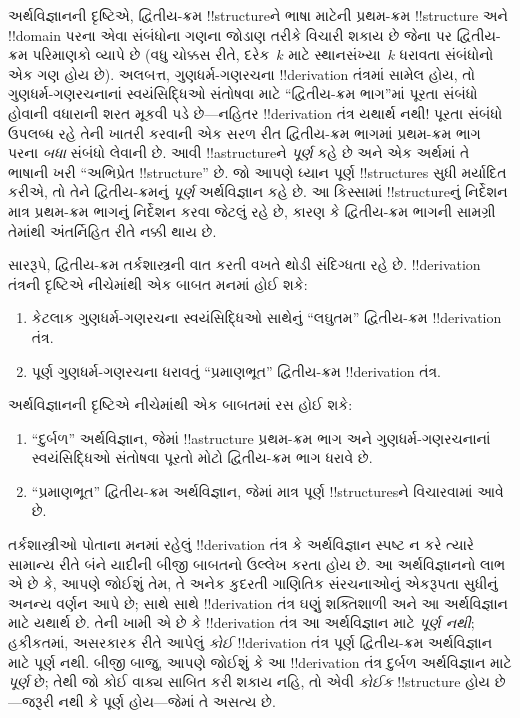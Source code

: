 \documentclass[../../../include/open-logic-section]{subfiles}
\begin{document}
અર્થવિજ્ઞાનની દૃષ્ટિએ, દ્વિતીય-ક્રમ !!{structure}ને ભાષા માટેની
પ્રથમ-ક્રમ !!{structure} અને !!{domain} પરના એવા સંબંધોના ગણના જોડાણ
તરીકે વિચારી શકાય છે જેના પર દ્વિતીય-ક્રમ પરિમાણકો વ્યાપે છે (વધુ
ચોક્કસ રીતે, દરેક~$k$ માટે સ્થાનસંખ્યા~$k$ ધરાવતા સંબંધોનો એક ગણ હોય
છે). અલબત્ત, ગુણધર્મ-ગણરચના !!{derivation} તંત્રમાં સામેલ હોય, તો
ગુણધર્મ-ગણરચનાનાં સ્વયંસિદ્ધિઓ સંતોષવા માટે ``દ્વિતીય-ક્રમ ભાગ''માં
પૂરતા સંબંધો હોવાની વધારાની શરત મૂકવી પડે છે---નહિતર !!{derivation}
તંત્ર યથાર્થ નથી!{} પૂરતા સંબંધો ઉપલબ્ધ રહે તેની ખાતરી કરવાની એક સરળ
રીત દ્વિતીય-ક્રમ ભાગમાં પ્રથમ-ક્રમ ભાગ પરના \emph{બધા} સંબંધો લેવાની
છે. આવી !!a{structure}ને \emph{પૂર્ણ} કહે છે અને એક અર્થમાં તે ભાષાની
ખરી ``અભિપ્રેત !!{structure}'' છે. જો આપણે ધ્યાન પૂર્ણ !!{structure}s
સુધી મર્યાદિત કરીએ, તો તેને દ્વિતીય-ક્રમનું \emph{પૂર્ણ} અર્થવિજ્ઞાન
કહે છે. આ કિસ્સામાં !!{structure}નું નિર્દેશન માત્ર પ્રથમ-ક્રમ ભાગનું
નિર્દેશન કરવા જેટલું રહે છે, કારણ કે દ્વિતીય-ક્રમ ભાગની સામગ્રી તેમાંથી
અંતર્નિહિત રીતે નક્કી થાય છે.

સારરૂપે, દ્વિતીય-ક્રમ તર્કશાસ્ત્રની વાત કરતી વખતે થોડી સંદિગ્ધતા રહે છે.
!!{derivation} તંત્રની દૃષ્ટિએ નીચેમાંથી એક બાબત મનમાં હોઈ શકે:
\begin{enumerate}
\item કેટલાક ગુણધર્મ-ગણરચના સ્વયંસિદ્ધિઓ સાથેનું ``લઘુતમ'' દ્વિતીય-ક્રમ
  !!{derivation} તંત્ર.
\item પૂર્ણ ગુણધર્મ-ગણરચના ધરાવતું ``પ્રમાણભૂત'' દ્વિતીય-ક્રમ
  !!{derivation} તંત્ર.
\end{enumerate}
અર્થવિજ્ઞાનની દૃષ્ટિએ નીચેમાંથી એક બાબતમાં રસ હોઈ શકે:
\begin{enumerate}
\item ``દુર્બળ'' અર્થવિજ્ઞાન, જેમાં !!a{structure} પ્રથમ-ક્રમ ભાગ અને
  ગુણધર્મ-ગણરચનાનાં સ્વયંસિદ્ધિઓ સંતોષવા પૂરતો મોટો દ્વિતીય-ક્રમ ભાગ
  ધરાવે છે.
\item ``પ્રમાણભૂત'' દ્વિતીય-ક્રમ અર્થવિજ્ઞાન, જેમાં માત્ર પૂર્ણ
  !!{structure}sને વિચારવામાં આવે છે.
\end{enumerate}
તર્કશાસ્ત્રીઓ પોતાના મનમાં રહેલું !!{derivation} તંત્ર કે અર્થવિજ્ઞાન
સ્પષ્ટ ન કરે ત્યારે સામાન્ય રીતે બંને યાદીની બીજી બાબતનો ઉલ્લેખ કરતા
હોય છે. આ અર્થવિજ્ઞાનનો લાભ એ છે કે, આપણે જોઈશું તેમ, તે અનેક કુદરતી
ગાણિતિક સંરચનાઓનું એકરૂપતા સુધીનું અનન્ય વર્ણન આપે છે; સાથે સાથે
!!{derivation} તંત્ર ઘણું શક્તિશાળી અને આ અર્થવિજ્ઞાન માટે યથાર્થ છે.
તેની ખામી એ છે કે !!{derivation} તંત્ર આ અર્થવિજ્ઞાન માટે \emph{પૂર્ણ
નથી}; હકીકતમાં, અસરકારક રીતે આપેલું \emph{કોઈ} !!{derivation} તંત્ર
પૂર્ણ દ્વિતીય-ક્રમ અર્થવિજ્ઞાન માટે પૂર્ણ નથી. બીજી બાજુ, આપણે જોઈશું
કે આ !!{derivation} તંત્ર દુર્બળ અર્થવિજ્ઞાન માટે \emph{પૂર્ણ} છે; તેથી
જો કોઈ વાક્ય સાબિત કરી શકાય નહિ, તો એવી \emph{કોઈક} !!{structure}
હોય છે---જરૂરી નથી કે પૂર્ણ હોય---જેમાં તે અસત્ય છે.
\end{document}
